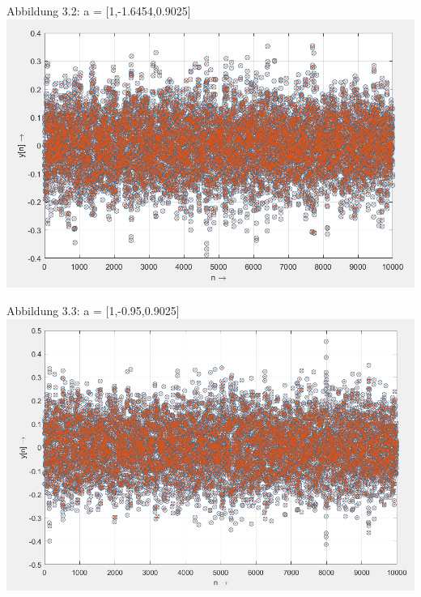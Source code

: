 \begin{center}
Abbildung 3.2: a = [1,-1.6454,0.9025]\\
\includegraphics[scale=0.7]{../Tab4_2_14B_l1.PNG}
\end{center}

\newpage

\begin{center}
Abbildung 3.3: a = [1,-0.95,0.9025]\\
\includegraphics[scale=0.7]{../Tab4_3_14B_l1.PNG}
\end{center}

